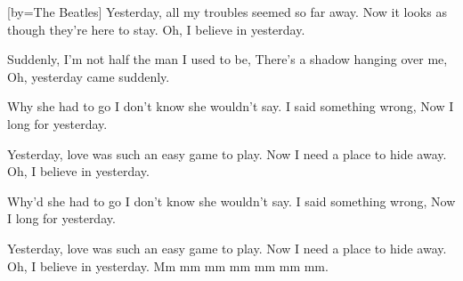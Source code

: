 [by={The Beatles}]
\beginchorus
Yesterday, all my troubles seemed so far away.
Now it looks as though they're here to stay.
Oh, I believe in yesterday.
\endchorus

\beginverse
Suddenly,
I'm not half the man I used to be,
There's a shadow hanging over me,
Oh, yesterday came suddenly.
\endverse

\beginverse 
Why she had to go
I don't know she wouldn't say.
I said something wrong,
Now I long for yesterday.
\endverse

\beginchorus
Yesterday, love was such an easy game to play.
Now I need a place to hide away.
Oh, I believe in yesterday.
\endchorus

\beginverse
Why'd she had to go
I don't know she wouldn't say.
I said something wrong,
Now I long for yesterday.
\endverse

\beginchorus
Yesterday, love was such an easy game to play.
Now I need a place to hide away.
Oh, I believe in yesterday.
Mm mm mm mm mm mm mm.
\endchorus
\endsong